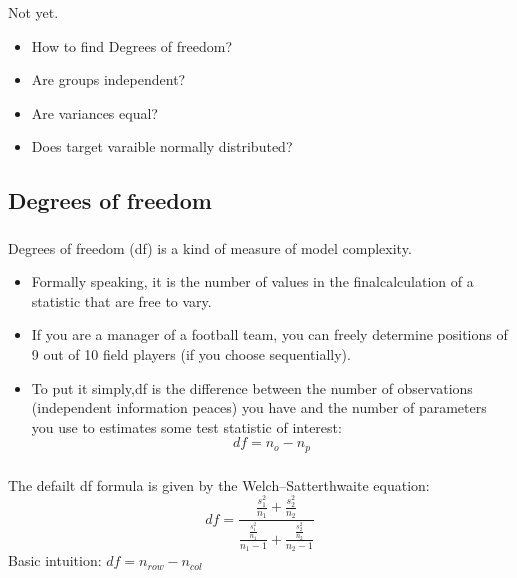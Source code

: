 \documentclass[t, 11pt]{beamer}
\begin{document}
	\begin{frame}
		
		\frametitle{\insertsection} 
		\framesubtitle{\insertsubsection} 
		
		Not yet. 
		
		\begin{itemize}
			\item How to find Degrees of freedom?
			\item Are groups independent?
			\item Are variances equal?
			\item Does target varaible normally distributed?
		\end{itemize}
		
		
	\end{frame}	

\subsection{Degrees of freedom}

	\begin{frame}
		\frametitle{\insertsection} 
		\framesubtitle{\insertsubsection} 
		Degrees of freedom (df) is a kind of measure of model complexity.
		
		\vspace{1cm}
	
		\begin{itemize}		
		\item Formally speaking, it is the number of values in the finalcalculation of a statistic that are free to vary.
		
		\item 	If you are a manager of a football team, you can freely determine positions of 9 out of 10 field players (if you choose sequentially).
		
		\item 	To put it simply,df is the difference between the number of observations (independent information peaces) you have and the number of parameters you use to estimates some test statistic of interest:
			$$df=n_o - n_p$$
		
	\end{itemize}

	\end{frame}	

	\begin{frame}
	\frametitle{\insertsection} 
	\framesubtitle{\insertsubsection} 
	
	The defailt df formula is given by the Welch–Satterthwaite equation:
\[
df=\frac{\frac{s_{1}^{2}}{n_1}+\frac{s_{2}^{2}}{n_2}}{\frac{\frac{s_{1}^{2}}{n_1}}{n_1-1}+\frac{\frac{s_{2}^{2}}{n_2}}{n_2-1}}
\]
Basic intuition: $df  = n_{row} - n_{col}$ 
\end{frame}	
\end{document}
